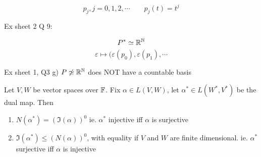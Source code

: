 \documentclass[a4paper]{article}
\begin{document}
\[ p_{j},j = 0,1,2,\cdots \qquad p_{j}(t) = t^{j} \]

Ex sheet 2 Q 9:

\[ P^{*} \simeq \mathbb{R}^{\mathbb{N}} \]
\[ \varepsilon \mapsto (\varepsilon(p_{0}), \varepsilon(p_{1}),\cdots  \]

Ex sheet 1, Q3 g) $ P \not \simeq \mathbb{R}^{\mathbb{N}} $ does NOT have a countable basis

\begin{lemma} 
	Let $ V,W $ be vector spaces over $ \mathbb{F} $. Fix $ \alpha \in L(V,W) $, let $ \alpha^{*} \in L(W^{*},V^{*}) $ be the dual map. Then
	\begin{enumerate}
		\item $ N(\alpha^{*})  = (\Im(\alpha))^{0} $ ie. $ \alpha^{*} $ injective iff $ \alpha $ is surjective
		\item $ \Im(\alpha^{*}) \leq (N(\alpha))^{0} $, with equality if $ V $
and $ W $ are finite dimensional. ie. $ \alpha^{*} $ surjective iff $ \alpha $ is injective	
	\end{enumerate}
\end{lemma}
\end{document}
